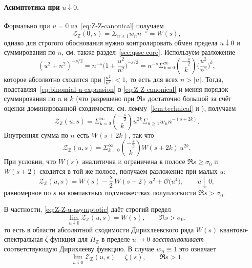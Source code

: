 \documentclass{article}
\numberwithin{equation}{section}
\theoremstyle{plain}
\theoremstyle{definition}
\theoremstyle{remark}
\def\infty{∞}\def\partial{∂}\def\sum{Σ}\def\int{∫}%
\begin{document}
\paragraph{Асимптотика при \texorpdfstring{$u\downarrow 0$}{u→0}.}
Формально при $u=0$ из~\eqref{eq:Z-Z-canonical} получаем
\begin{equation}
\label{eq:Z-Z-at-u-zero-formal}
\mathcal Z_{\mathbb Z}(0,s)
=
\sum_{n\ge 1}w_n n^{-s}
=
W(s),
\end{equation}
однако для строгого обоснования нужно контролировать обмен предела
$u\downarrow 0$ и суммирования по $n$, см. также раздел~\ref{sec:qssc-core}.
Используем разложение
\begin{equation}
\label{eq:binomial-u-expansion}
(u^2+n^2)^{-s/2}
=
n^{-s}
\Big(1+\frac{u^2}{n^2}\Big)^{-s/2}
=
n^{-s}
\sum_{k=0}^\infty
\binom{-\frac s2}{k}
\Big(\frac{u^2}{n^2}\Big)^k,
\end{equation}
которое абсолютно сходится при
$\big|\frac{u^2}{n^2}\big|<1$, то есть для всех $n>\vert u\vert$.
Тогда, подставляя~\eqref{eq:binomial-u-expansion} в
\eqref{eq:Z-Z-canonical} и меняя порядок суммирования по $n$ и $k$
(что разрешено при $\Re s$ достаточно большой за счёт оценки
доминированной сходимости, см. лемму~\ref{lem:technical} и
\cite{Folland1999}), получаем
\begin{equation}
\label{eq:Z-Z-double-sum}
\mathcal Z_{\mathbb Z}(u,s)
=
\sum_{k=0}^\infty
\binom{-\frac s2}{k}
u^{2k}
\sum_{n\ge 1} w_n n^{-(s+2k)}.
\end{equation}
Внутренняя сумма по $n$ есть $W(s+2k)$, так что
\begin{equation}
\label{eq:Z-Z-u-expansion}
\mathcal Z_{\mathbb Z}(u,s)
=
\sum_{k=0}^\infty
\binom{-\frac s2}{k}
W(s+2k)\,u^{2k}.
\end{equation}
При условии, что $W(s)$ аналитична и ограничена в полосе
$\Re s\ge \sigma_0$ и $W(s+2)$ сходится в той же полосе, получаем
разложение при малых $u$:
\begin{equation}
\label{eq:Z-Z-u-asymptotic}
\mathcal Z_{\mathbb Z}(u,s)
=
W(s)
-
\frac{s}{2}\,W(s+2)\,u^{2}
+
\mathcal O\big(u^{4}\big),
\qquad
u\downarrow 0,
\end{equation}
равномерное по $s$ на компактных подмножествах полуплоскости
$\Re s>\sigma_0$.

В частности, \eqref{eq:Z-Z-u-asymptotic} даёт строгий предел
\begin{equation}
\label{eq:Z-Z-limit-u-to-zero}
\lim_{u\downarrow 0}\mathcal Z_{\mathbb Z}(u,s)
=
W(s),
\qquad
\Re s>\sigma_0,
\end{equation}
то есть в области абсолютной сходимости Дирихлеевского ряда
$W(s)$ квантово-спектральная ζ-функция для $H_{\mathbb Z}$ в пределе
$u\to 0$ \emph{восстанавливает} соответствующую Дирихлееву функцию.
В случае $w_n\equiv 1$ это означает
\begin{equation}
\label{eq:Z-Z-to-Riemann}
\lim_{u\downarrow 0}\mathcal Z_{\mathbb Z}(u,s)
=
\zeta(s),
\qquad
\Re s>1.
\end{equation}
\end{document}
